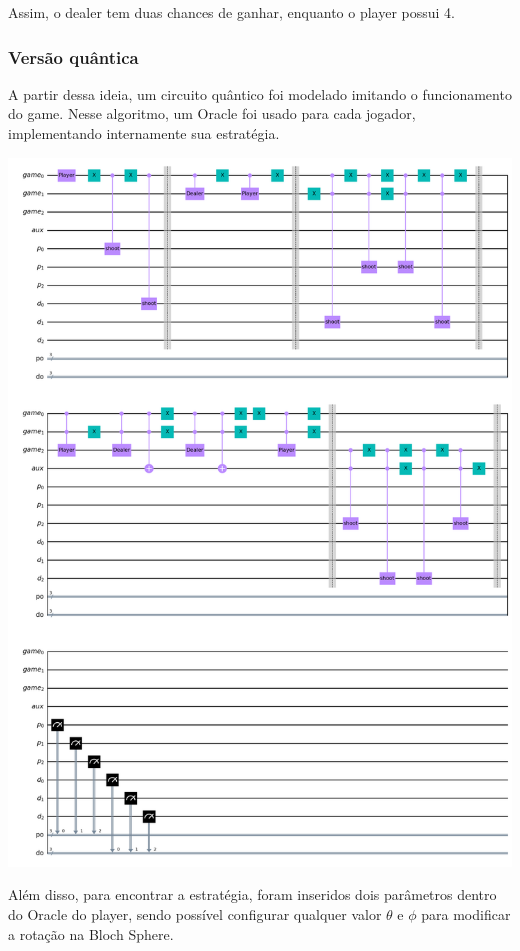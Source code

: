 \documentclass{article}
\begin{document}
Assim, o dealer tem duas chances de ganhar, enquanto o player possui 4.

\subsubsection{Versão quântica}

A partir dessa ideia, um circuito quântico foi modelado imitando o funcionamento do game. Nesse algoritmo, um Oracle foi usado para cada jogador, implementando internamente sua estratégia.

\begin{center}
	\includegraphics[scale=0.3]{quantum_buckshot_roulette.png}
	\label{fig:bckr-circuit}
\end{center}

Além disso, para encontrar a estratégia, foram inseridos dois parâmetros dentro do Oracle do player, sendo possível configurar qualquer valor $\theta$ e $\phi$ para modificar a rotação na Bloch Sphere.
\end{document}
